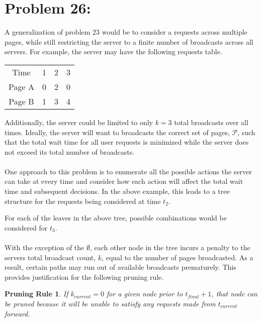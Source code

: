 \documentclass[12pt]{article}
\newtheorem*{prune}{Pruning Rule}
\begin{document}
\section*{Problem 26:}
A generalization of problem 23 would be to consider a requests across multiple pages, while
still restricting the server to a finite number of broadcasts across all servers. For example,
the server may have the following requests table.
\begin{center}
    \begin{tabular}{c|c|c|c}
        Time & 1 & 2 & 3  \\
        Page A & 0 & 2 & 0  \\
        Page B & 1 & 3 & 4  \\
    \end{tabular}
\end{center}
Additionally, the server could be limited to only $k=3$ total broadcasts over all times.  Ideally,
the server will want to broadcasts the correct set of pages, $\mathcal{P}$, such that 
the total wait time for all user requests is minimized while the server does not exceed
its total number of broadcasts.\\\\
One approach to this problem is to enumerate all the possible actions the server
can take at every time and consider how each action will affect the total wait time
and subsequent decisions.  In the above example, this leads to a tree structure for 
the requests being considered at time $t_2$.
\begin{center}
\end{center} 
For each of the leaves in the above tree, possible combinations would be considered
for $t_3$.\\\\
With the exception of the $\emptyset$, each other node in the tree incurs a penalty
to the servers total broadcast count, $k$, equal to the number of pages broadcasted.
As a result, certain paths may run out of available broadcasts prematurely.  This 
provides justification for the following pruning rule.
\begin{prune}
If $k_{current} = 0$ for a given node prior to $t_{final}+1$, that node can be
pruned because it will be unable to satisfy any requests made from $t_{current}$ 
forward.  
\end{prune}
\end{document}
